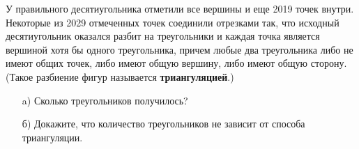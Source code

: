 
У правильного десятиугольника отметили все вершины и еще 2019 точек внутри. Некоторые из 2029 отмеченных точек соединили отрезками так, 
что исходный десятиугольник  оказался разбит на треугольники и каждая точка является вершиной хотя бы одного треугольника, причем любые два 
треугольника либо не имеют общих точек, либо имеют общую вершину, либо имеют общую сторону. (Такое разбиение фигур называется \textbf{триангуляцией}.) 

\begin{enumerate}
    \item[a)] Сколько треугольников получилось?
    \item[б)] Докажите, что количество треугольников не зависит от способа триангуляции.
\end{enumerate}